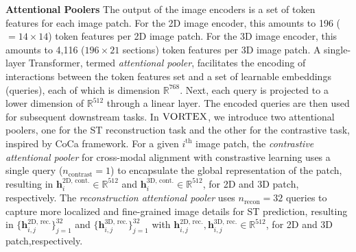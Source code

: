 \noindent\textbf{Attentional Poolers} The output of the image encoders is a set of token features for each image patch. For the 2D image encoder, this amounts to 196 ($=14\times 14$) token features per 2D image patch. For the 3D image encoder, this amounts to 4,116 ($196\times 21$ sections) token features per 3D image patch. A single-layer Transformer, termed \textit{attentional pooler}, facilitates the encoding of interactions between the token features set and a set of learnable embeddings (queries), each of which is dimension $\mathbb{R}^{768}$. Next, each query is projected to a lower dimension of $\mathbb{R}^{512}$ through a linear layer. The encoded queries are then used for subsequent downstream tasks.
In $\textsc{VORTEX}$, we introduce two attentional poolers, one for the ST reconstruction task and the other for the contrastive task, inspired by CoCa framework\cite{yu2022coca}. For a given $i^{\text{th}}$ image patch, the \textit{contrastive attentional pooler} for cross-modal alignment with constrastive learning uses a single query ($n_{\text{contrast}}=1$) to encapsulate the global representation of the patch, resulting in $\mathbf{h}_i^{\text{2D, cont.}}\in\mathbb{R}^{512}$ and $\mathbf{h}_i^{\text{3D, cont.}}\in\mathbb{R}^{512}$, for 2D and 3D patch, respectively. The \textit{reconstruction attentional pooler} uses $n_{\text{recon}}=32$ queries to capture more localized and fine-grained image details for ST prediction, resulting in $\{\mathbf{h}_{i,j}^{\text{2D, rec.}}\}_{j=1}^{32}$ and $\{\mathbf{h}_{i,j}^{\text{3D, rec.}}\}_{j=1}^{32}$ with $\mathbf{h}_{i,j}^{\text{2D, rec.}}, \mathbf{h}_{i,j}^{\text{3D, rec.}}\in\mathbb{R}^{512}$, for 2D and 3D patch,respectively.

